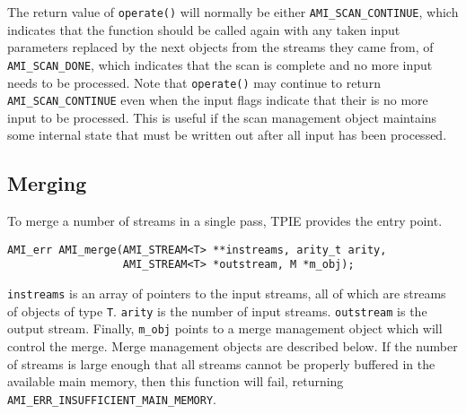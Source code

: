 The return value of \verb|operate()| will normally be either
\verb|AMI_SCAN_CONTINUE|,
 which indicates that the function should be
called again with any taken input parameters replaced by the next objects
from the streams they came from, of \verb|AMI_SCAN_DONE|, which indicates
that the scan is complete and no more input needs to be processed.  Note
that \verb|operate()| may continue to return \verb|AMI_SCAN_CONTINUE| even
when the input flags indicate that their is no more input to be processed.
This is useful if the scan management object maintains some internal state
that must be written out after all input has been processed.




\subsection{Merging}
\label{sec:ref-ami-merge}

To merge a number of streams in a single pass,
TPIE provides the entry point.

\begin{verbatim}
AMI_err AMI_merge(AMI_STREAM<T> **instreams, arity_t arity,
                  AMI_STREAM<T> *outstream, M *m_obj);
\end{verbatim}

\verb|instreams| is an array of pointers to the input streams, all of which
are streams of objects of type \verb|T|. \verb|arity| is the number of
input streams. \verb|outstream| is the output stream.  Finally,
\verb|m_obj| points to a merge management object which will control the
merge. Merge management objects are described below. If the number of
streams is large enough that all streams cannot be properly buffered in the
available main memory, then this function will fail, returning
\verb|AMI_ERR_INSUFFICIENT_MAIN_MEMORY|.

